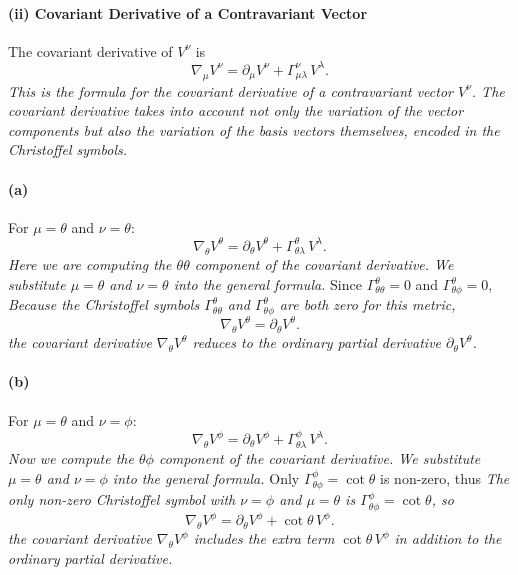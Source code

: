 \paragraph*{(ii) Covariant Derivative of a Contravariant Vector}
The covariant derivative of \(V^\nu\) is
\[
\nabla_\mu V^\nu
=
\partial_\mu V^\nu + \Gamma^\nu_{\mu\lambda}\,V^\lambda.
\]
\emph{This is the formula for the covariant derivative of a contravariant vector \(V^\nu\). The covariant derivative takes into account not only the variation of the vector components but also the variation of the basis vectors themselves, encoded in the Christoffel symbols.}

\paragraph{(a)} For \(\mu = \theta\) and \(\nu = \theta\):
\[
\nabla_{\theta} V^\theta
=
\partial_\theta V^\theta
+
\Gamma^\theta_{\theta \lambda}\, V^\lambda.
\]
\emph{Here we are computing the \(\theta\theta\) component of the covariant derivative. We substitute \(\mu = \theta\) and \(\nu = \theta\) into the general formula.}
Since \(\Gamma^\theta_{\theta\theta} = 0\) and \(\Gamma^\theta_{\theta\phi} = 0\),
\emph{Because the Christoffel symbols \(\Gamma^\theta_{\theta\theta}\) and \(\Gamma^\theta_{\theta\phi}\) are both zero for this metric,}
\[
\nabla_{\theta} V^\theta
=
\partial_\theta V^\theta.
\]
\emph{the covariant derivative \(\nabla_{\theta} V^\theta\) reduces to the ordinary partial derivative \(\partial_\theta V^\theta\).}

\paragraph{(b)} For \(\mu = \theta\) and \(\nu = \phi\):
\[
\nabla_{\theta} V^\phi
=
\partial_\theta V^\phi
+
\Gamma^\phi_{\theta\lambda}\,V^\lambda.
\]
\emph{Now we compute the \(\theta\phi\) component of the covariant derivative. We substitute \(\mu = \theta\) and \(\nu = \phi\) into the general formula.}
Only \(\Gamma^\phi_{\theta\phi} = \cot\theta\) is non-zero, thus
\emph{The only non-zero Christoffel symbol with \(\nu = \phi\) and \(\mu = \theta\) is \(\Gamma^\phi_{\theta\phi} = \cot\theta\), so}
\[
\nabla_{\theta} V^\phi
=
\partial_\theta V^\phi + \cot\theta \, V^\phi.
\]
\emph{the covariant derivative \(\nabla_{\theta} V^\phi\) includes the extra term \(\cot\theta \, V^\phi\) in addition to the ordinary partial derivative.}

